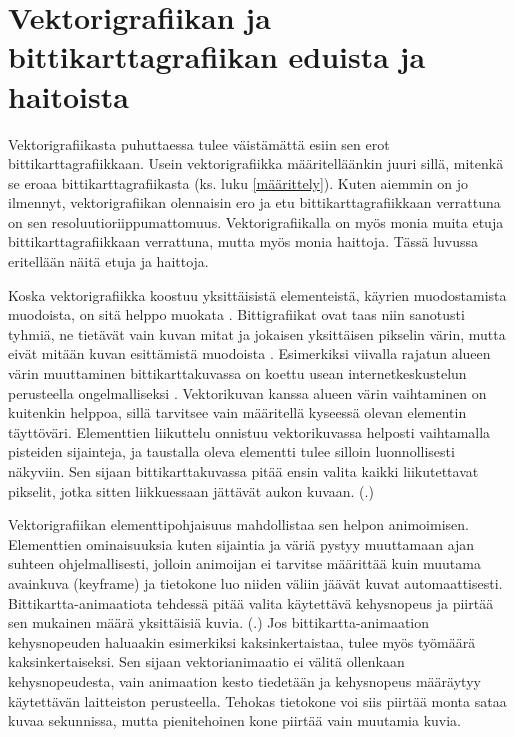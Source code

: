 \documentclass[utf8,bachelor]{gradu3}
\newcommand{\parencitedot}[1]{(\cite{#1}.)}
\begin{document}
\section{Vektorigrafiikan ja bittikarttagrafiikan eduista ja haitoista}\label{vertailu}


Vektorigrafiikasta puhuttaessa tulee väistämättä esiin sen erot bittikarttagrafiikkaan. Usein vektorigrafiikka määritelläänkin juuri sillä, mitenkä se eroaa bittikarttagrafiikasta (ks. luku \ref{määrittely}). Kuten aiemmin on jo ilmennyt, vektorigrafiikan olennaisin ero ja etu bittikarttagrafiikkaan verrattuna on sen resoluutioriippumattomuus. Vektorigrafiikalla on myös monia muita etuja bittikarttagrafiikkaan verrattuna, mutta myös monia haittoja. Tässä luvussa eritellään näitä etuja ja haittoja.

Koska vektorigrafiikka koostuu yksittäisistä elementeistä, käyrien muodostamista muodoista, on sitä helppo muokata \parencite{RefWorks:doc:5bdc5224e4b05afcfde5b159}. Bittigrafiikat ovat taas niin sanotusti tyhmiä, ne tietävät vain kuvan mitat ja jokaisen yksittäisen pikselin värin, mutta eivät mitään kuvan esittämistä muodoista \parencite{RefWorks:doc:5bdc5292e4b05afcfde5b171}. Esimerkiksi viivalla rajatun alueen värin muuttaminen bittikarttakuvassa on koettu usean internetkeskustelun perusteella ongelmalliseksi \parencites{RefWorks:doc:5bdf1069e4b0a1f99c63c515}{RefWorks:doc:5bdf10ece4b0273295d72f8a}{RefWorks:doc:5bdf119fe4b0b329c55e47c9}. Vektorikuvan kanssa alueen värin vaihtaminen on kuitenkin helppoa, sillä tarvitsee vain määritellä kyseessä olevan elementin täyttöväri. Elementtien liikuttelu onnistuu vektorikuvassa helposti vaihtamalla pisteiden sijainteja, ja taustalla oleva elementti tulee silloin luonnollisesti näkyviin. Sen sijaan bittikarttakuvassa pitää ensin valita kaikki liikutettavat pikselit, jotka sitten liikkuessaan jättävät aukon kuvaan. \parencitedot{RefWorks:doc:5bdc5224e4b05afcfde5b159}

Vektorigrafiikan elementtipohjaisuus mahdollistaa sen helpon animoimisen. Elementtien ominaisuuksia kuten sijaintia ja väriä pystyy muuttamaan ajan suhteen ohjelmallisesti, jolloin animoijan ei tarvitse määrittää kuin muutama avainkuva (keyframe) ja tietokone luo niiden väliin jäävät kuvat automaattisesti. Bittikartta-animaatiota tehdessä pitää valita käytettävä kehysnopeus ja piirtää sen mukainen määrä yksittäisiä kuvia. \parencitedot{RefWorks:doc:5bdc5224e4b05afcfde5b159} Jos bittikartta-animaation kehysnopeuden haluaakin esimerkiksi kaksinkertaistaa, tulee myös työmäärä kaksinkertaiseksi. Sen sijaan vektorianimaatio ei välitä ollenkaan kehysnopeudesta, vain animaation kesto tiedetään ja kehysnopeus määräytyy käytettävän laitteiston perusteella. Tehokas tietokone voi siis piirtää monta sataa kuvaa sekunnissa, mutta pienitehoinen kone piirtää vain muutamia kuvia.
\end{document}
